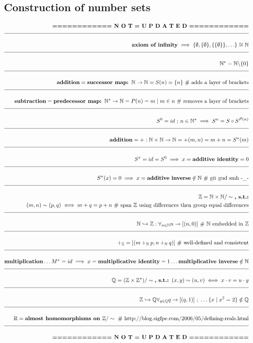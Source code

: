\documentclass[a4paper]{article}
\newcommand{\melazy}{\textbf{============ N O T = U P D A T E D ============}}
\newcommand{\eqComment}[1]{\text{  \# #1}}
\newcommand{\eqSep}{\text{ ;  }}
\newcommand{\n}{\\[1.5ex] \hline \nonumber \\[0ex]}
\newcommand{\m}{\nonumber \\}
\begin{document}
\subsection{Construction of number sets}
\begin{tcolorbox}
\begin{align}
   \melazy
\n \textbf{axiom of infinity} \implies \{\emptyset, \{\emptyset\}, \{\{\emptyset\}\}, \ldots\} \cong \mathbb{N}
\n \mathbb{N}^\star = \mathbb{N} \backslash \{0\}
\n \textbf{addition} = \textbf{successor map: $\mathbb{N} \to \mathbb{N}$} = S(n) = \{n\} \eqComment{adds a layer of brackets}
\n \textbf{subtraction} = \textbf{predecessor map: $\mathbb{N}^\star \to \mathbb{N}$} = P(n) = m \mid m \in n \eqComment{removes a layer of brackets}
\n S^0 = id \eqSep n \in \mathbb{N}^\star \implies S^n = S \circ S^{P(n)}
\n \textbf{addition} = +: \mathbb{N} \times \mathbb{N} \to \mathbb{N} = +(m, n) = m + n = S^n(m)
\n S^x = id = S^0 \implies x = \textbf{additive identity} = 0 
\n S^n(x) = 0 \implies x = \textbf{additive inverse} \notin \mathbb{N} \eqComment{git gud smh -\_-}
\n \mathbb{Z} = \mathbb{N} \times \mathbb{N} / \sim \textbf{, s.t.:}
\m (m, n) \sim (p, q) \iff m + q = p + n \eqComment{span $\mathbb{Z}$ using differences then group equal differences}
\n \mathbb{N} \hookrightarrow \mathbb{Z}: \forall_{n \in \mathbb{N}} n \to [(n, 0)] \eqComment{$\mathbb{N}$ embedded in $\mathbb{Z}$}
\n +_\mathbb{Z} = [(m +_\mathbb{N} p, n +_\mathbb{N} q)] \eqComment{well-defined and consistent}
\n \textbf{multiplication} \ldots M^x = id \implies x = \textbf{multiplicative identity} = 1 \ldots \textbf{multiplicative inverse} \notin \mathbb{N}
\n \mathbb{Q} = (\mathbb{Z} \times \mathbb{Z}^\star) / \sim \textbf{, s.t.: } (x,y) \sim (u,v) \iff x \cdot v = u \cdot y
\n \mathbb{Z} \hookrightarrow \mathbb{Q} \forall_{q \in \mathbb{Q}} q \to [(q,1)] \eqSep \ldots \{x \mid x^2 = 2\} \notin \mathbb{Q}
\n \mathbb{R} = \textbf{almost homomorphisms on $\mathbb{Z}$} / \sim \eqComment{http://blog.sigfpe.com/2006/05/defining-reals.html}
\n \melazy
\end{align}
\end{tcolorbox}
\end{document}
